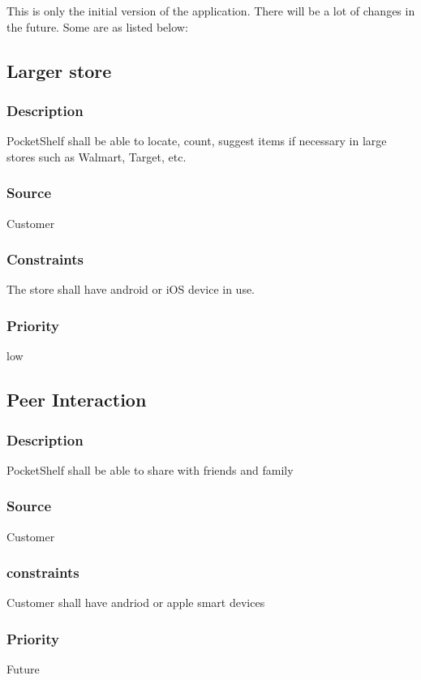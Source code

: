 
This is only the initial version of the application. There will be a lot of changes in the future. Some are as listed below:

\subsection{Larger store}
\subsubsection{Description}
PocketShelf shall be able to locate, count, suggest items if necessary in large stores such as Walmart, Target, etc.
\subsubsection{Source}
Customer
\subsubsection{Constraints}
The store shall have android or iOS device in use.

\subsubsection{Priority}
low

\subsection{Peer Interaction}
\subsubsection{Description}
PocketShelf shall be able to share with friends and family
\subsubsection{Source}
Customer
\subsubsection{constraints}
 Customer shall have andriod or apple smart devices
\subsubsection{Priority}
Future


